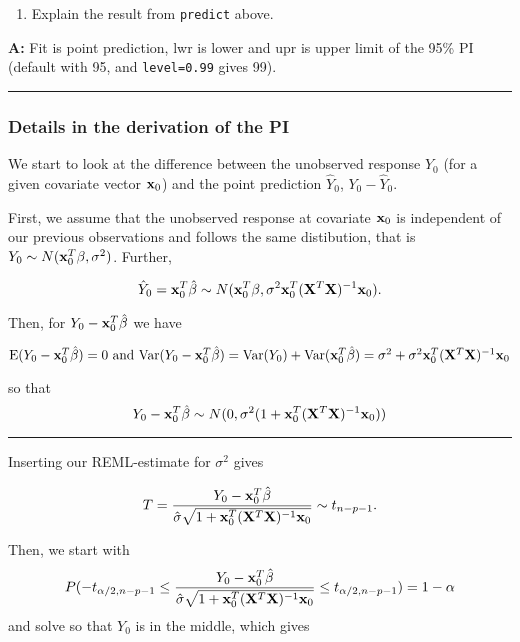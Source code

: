 \documentclass[]{article}
\providecommand{\tightlist}{%
  \setlength{\itemsep}{0pt}\setlength{\parskip}{0pt}}
\begin{document}
\begin{enumerate}
\def\labelenumi{\arabic{enumi}.}
\setcounter{enumi}{1}
\tightlist
\item
  Explain the result from \texttt{predict} above.
\end{enumerate}

\textbf{A:} Fit is point prediction, lwr is lower and upr is upper limit
of the 95\% PI (default with 95, and \texttt{level=0.99} gives 99).

\begin{center}\rule{0.5\linewidth}{\linethickness}\end{center}

\hypertarget{details-in-the-derivation-of-the-pi}{%
\subsubsection{Details in the derivation of the
PI}\label{details-in-the-derivation-of-the-pi}}

We start to look at the difference between the unobserved response
\(Y_0\) (for a given covariate vector \({\bf x}_0\)) and the point
prediction \(\hat{Y}_0\), \(Y_0-\hat{Y}_0\).

First, we assume that the unobserved response at covariate \({\bf x}_0\)
is independent of our previous observations and follows the same
distibution, that is \(Y_0 \sim N({\bf x}_0^T \beta,\sigma^2)\).
Further,

\[\hat{Y}_0={\bf x}_0^T \hat{\beta} \sim N({\bf x}_0^T \beta,\sigma^2 {\bf x}_0^T({\bf X}^T{\bf X})^{-1}{\bf x}_0).\]

Then, for \(Y_0-{\bf x}_0^T \hat{\beta}\) we have

\(\text{E}(Y_0-{\bf x}_0^T \hat{\beta})=0 \text{ and } \text{Var}(Y_0-{\bf x}_0^T \hat{\beta})=\text{Var}(Y_0)+\text{Var}({\bf x}_0^T \hat{\beta})=\sigma^2+\sigma^2{\bf x}_0^T({\bf X}^T{\bf X})^{-1}{\bf x}_0\)

so that
\[Y_0-{\bf x}_0^T \hat{\beta}\sim N(0,\sigma^2 (1+{\bf x}_0^T({\bf X}^T{\bf X})^{-1}{\bf x}_0)) \]

\begin{center}\rule{0.5\linewidth}{\linethickness}\end{center}

Inserting our REML-estimate for \(\sigma^2\) gives

\[T=\frac{Y_0-{\bf x}_0^T \hat{\beta}}{\hat{\sigma}\sqrt{1+{\bf x}_0^T({\bf X}^T{\bf X})^{-1}{\bf x}_0}}\sim t_{n-p-1}.\]

Then, we start with
\[ P(-t_{\alpha/2,n-p-1}\le \frac{Y_0-{\bf x}_0^T \hat{\beta}}{\hat{\sigma}\sqrt{1+{\bf x}_0^T({\bf X}^T{\bf X})^{-1}{\bf x}_0}} \le t_{\alpha/2,n-p-1})=1-\alpha\]
and solve so that \(Y_0\) is in the middle, which gives
\end{document}
